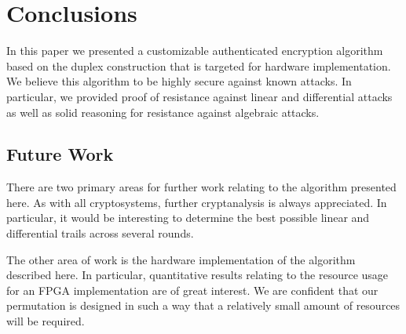 \section{Conclusions}
In this paper we presented a customizable authenticated encryption algorithm based on the duplex construction that is targeted for hardware implementation.
We believe this algorithm to be highly secure against known attacks.
In particular, we provided proof of resistance against linear and differential attacks as well as solid reasoning for resistance against algebraic attacks.

\subsection{Future Work}
There are two primary areas for further work relating to the algorithm presented here.
As with all cryptosystems, further cryptanalysis is always appreciated.
In particular, it would be interesting to determine the best possible linear and differential trails across several rounds.

The other area of work is the hardware implementation of the algorithm described here.
In particular, quantitative results relating to the resource usage for an FPGA implementation are of great interest.
We are confident that our permutation is designed in such a way that a relatively small amount of resources will be required.

\begin{comment}
In addition to further cryptanalysis, more analysis should be performed on similar $2 \times 2$ matrices so that a list of drop-in replacements within our security margin is readily available.
It is desirable to perform statistical analysis on the remaining $16$-bit S-boxes provided by Wood.
Knowing their maximum linear biases and differential probabilities would likely allow them to act as drop-in replacements.
Until then, we have provided users with references to the tools required for such analysis.
\end{comment}

